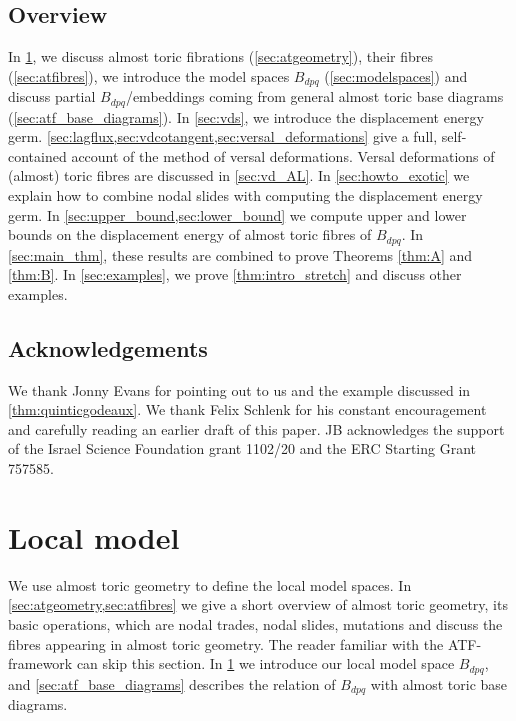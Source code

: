 \documentclass[12pt,a4paper,abstract=true,final]{scrartcl}
\begin{document}
\subsection{Overview}

In \cref{sec:local_model}, we discuss almost toric fibrations (\cref{sec:atgeometry}), their fibres (\cref{sec:atfibres}), we introduce the model spaces $B_{dpq}$ (\cref{sec:modelspaces}) and discuss partial $B_{dpq}$\-/embeddings coming from general almost toric base diagrams (\cref{sec:atf_base_diagrams}).
In \cref{sec:vds}, we introduce the displacement energy germ.
\cref{sec:lagflux,sec:vdcotangent,sec:versal_deformations} give a full, self-contained account of the method of versal deformations.
Versal deformations of (almost) toric fibres are discussed in \cref{sec:vd_AL}. In \cref{sec:howto_exotic} we explain how to combine nodal slides with computing the displacement energy germ.
In \cref{sec:upper_bound,sec:lower_bound} we compute upper and lower bounds on the displacement energy of almost toric fibres of $B_{dpq}$.
In \cref{sec:main_thm}, these results are combined to prove Theorems \ref{thm:A} and \ref{thm:B}.
In \cref{sec:examples}, we prove \cref{thm:intro_stretch} and discuss other examples.

\subsection{Acknowledgements}
We thank Jonny Evans for pointing out to us \cite{EvaUrz21} and the example discussed in \cref{thm:quinticgodeaux}.
We thank Felix Schlenk for his constant encouragement and carefully reading an earlier draft of this paper.
JB acknowledges the support of the Israel Science Foundation grant 1102/20 and the ERC Starting Grant 757585.

\section{Local model}
\label{sec:local_model}

We use almost toric geometry to define the local model spaces.
In \cref{sec:atgeometry,sec:atfibres} we give a short overview of almost toric geometry, its basic operations, which are nodal trades, nodal slides, mutations and discuss the fibres appearing in almost toric geometry.
The reader familiar with the ATF-framework can skip this section.
In \cref{sec:local_model} we introduce our local model space $B_{dpq}$, and \cref{sec:atf_base_diagrams} describes the relation of $B_{dpq}$ with almost toric base diagrams.
\end{document}
